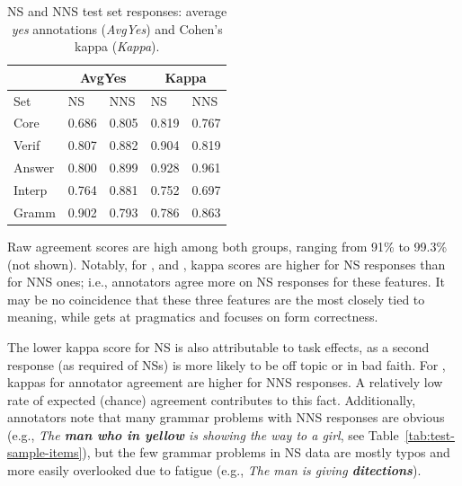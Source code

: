 \begin{table}[htb!]
\begin{center}
\begin{tabular}{|l||l|l||l|l|}
\hline
 & \multicolumn{2}{|c||}{AvgYes} & \multicolumn{2}{|c|}{Kappa} \\
\hline
 Set & NS & NNS & NS & NNS \\
\hline
\hline
Core  & 0.686 & 0.805 & 0.819 & 0.767 \\
\hline
Verif  & 0.807 & 0.882 & 0.904 & 0.819 \\
\hline
Answer  & 0.800 & 0.899 & 0.928 & 0.961 \\
\hline
Interp  & 0.764 & 0.881 & 0.752 & 0.697 \\
\hline
Gramm  & 0.902 & 0.793 & 0.786 & 0.863 \\
\hline
\end{tabular}
\caption{\label{tab:NSvNNSagreement} NS and NNS test set responses: average \textit{yes} annotations (\textit{AvgYes}) and Cohen's kappa (\textit{Kappa}).}
\end{center}
\end{table}



Raw agreement scores are high among both groups, ranging from 91\% to 99.3\% (not shown). Notably, for ,  and , kappa scores are higher for NS responses than for NNS ones; i.e., annotators agree more on NS responses for these features. It may be no coincidence that these three features are the most closely tied to meaning, while  gets at pragmatics and  focuses on form correctness.

The lower kappa score for NS  is also attributable to task effects, as a second response (as required of NSs) is more likely to be off topic or in bad faith. For , kappas for annotator agreement are higher for NNS responses. A relatively low rate of expected (chance) agreement contributes to this fact. Additionally, annotators note that many grammar problems with NNS responses are obvious (e.g., \textit{The \textbf{man who in yellow} is showing the way to a girl}, see Table~\ref{tab:test-sample-items}), but the few grammar problems in NS data are mostly typos and more easily overlooked due to fatigue (e.g., \textit{The man is giving \textbf{ditections}}).


